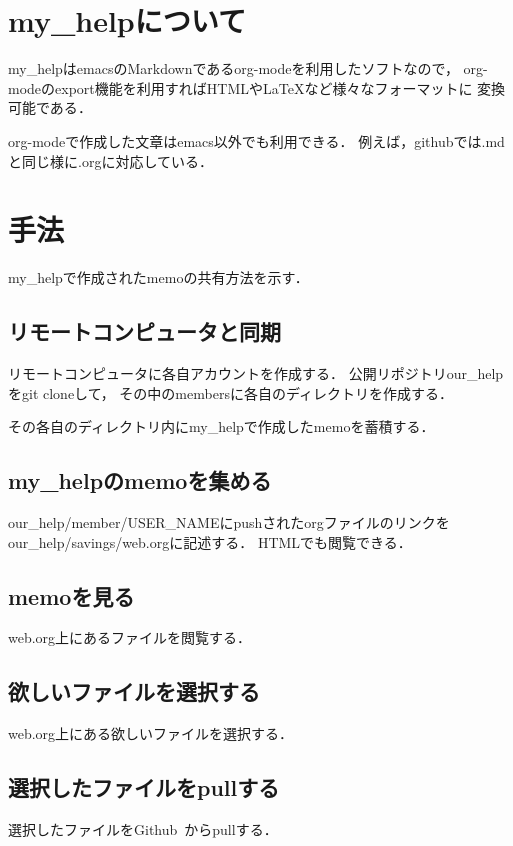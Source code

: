 \documentclass[a4j,twocolumn,uplatex]{jsarticle}
\begin{document}
\section{my\_helpについて}
my\_helpはemacsのMarkdownであるorg-modeを利用したソフトなので，
org-modeのexport機能を利用すればHTMLやLaTeXなど様々なフォーマットに
変換可能である\cite{org-mode}．

org-modeで作成した文章はemacs以外でも利用できる．
例えば，githubでは.mdと同じ様に.orgに対応している．

\section{手法}
my\_helpで作成されたmemoの共有方法を示す．
\subsection{リモートコンピュータと同期}
\label{sec-2-1}
リモートコンピュータに各自アカウントを作成する．
公開リポジトリour\_helpをgit cloneして，
その中のmembersに各自のディレクトリを作成する．                                                                  

その各自のディレクトリ内にmy\_helpで作成したmemoを蓄積する．                                          

\subsection{my\_helpのmemoを集める}
\label{sec-2-2}
our\_help/member/USER\_NAMEにpushされたorgファイルのリンクを
our\_help/savings/web.orgに記述する．
HTMLでも閲覧できる．

\subsection{memoを見る}
\label{sec-2-3}
web.org上にあるファイルを閲覧する．

\subsection{欲しいファイルを選択する}
\label{sec-2-4}
web.org上にある欲しいファイルを選択する．

\subsection{選択したファイルをpullする}
\label{sec-2-3}
選択したファイルをGithub からpullする．
\end{document}
